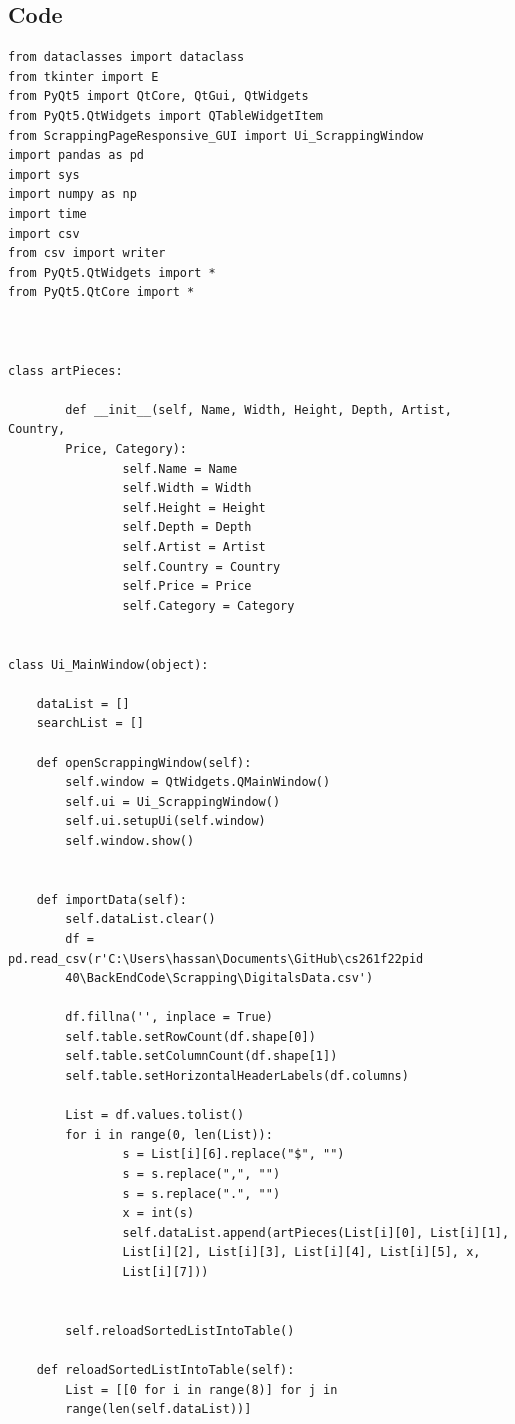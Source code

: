 \documentclass[12pt]{article}
\begin{document}
    \subsection{Code}
    \begin{verbatim}
from dataclasses import dataclass
from tkinter import E
from PyQt5 import QtCore, QtGui, QtWidgets
from PyQt5.QtWidgets import QTableWidgetItem
from ScrappingPageResponsive_GUI import Ui_ScrappingWindow 
import pandas as pd
import sys
import numpy as np
import time
import csv
from csv import writer
from PyQt5.QtWidgets import *
from PyQt5.QtCore import *



class artPieces:

        def __init__(self, Name, Width, Height, Depth, Artist, Country,
        Price, Category):
                self.Name = Name
                self.Width = Width
                self.Height = Height
                self.Depth = Depth
                self.Artist = Artist
                self.Country = Country
                self.Price = Price 
                self.Category = Category


class Ui_MainWindow(object):

    dataList = []
    searchList = []

    def openScrappingWindow(self):
        self.window = QtWidgets.QMainWindow()
        self.ui = Ui_ScrappingWindow()
        self.ui.setupUi(self.window)
        self.window.show()


    def importData(self):
        self.dataList.clear()
        df = pd.read_csv(r'C:\Users\hassan\Documents\GitHub\cs261f22pid
        40\BackEndCode\Scrapping\DigitalsData.csv')

        df.fillna('', inplace = True)
        self.table.setRowCount(df.shape[0])
        self.table.setColumnCount(df.shape[1])
        self.table.setHorizontalHeaderLabels(df.columns)

        List = df.values.tolist()
        for i in range(0, len(List)):
                s = List[i][6].replace("$", "")
                s = s.replace(",", "")
                s = s.replace(".", "")
                x = int(s)
                self.dataList.append(artPieces(List[i][0], List[i][1],
                List[i][2], List[i][3], List[i][4], List[i][5], x,
                List[i][7]))


        self.reloadSortedListIntoTable()

    def reloadSortedListIntoTable(self):
        List = [[0 for i in range(8)] for j in
        range(len(self.dataList))]


\end{verbatim}
\end{document}
